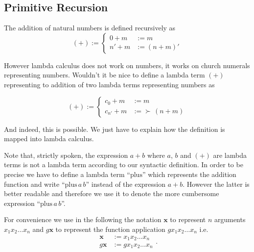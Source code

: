 \subsection{Primitive Recursion}

The addition of natural numbers is defined recursively as
$$
(+) :=
\begin{cases}
  0 + m &:= m \\
  n' + m &:= (n + m)'
\end{cases}
$$


However lambda calculus does not work on numbers, it works on church numerals
representing numbers. Wouldn't it be nice to define a lambda term $(+)$
representing to addition of two lambda terms representing numbers as

$$
(+) :=
\begin{cases}
  c_0 + m &:= m \\
  c_{n'} + m &:= \succ\, (n + m)
\end{cases}
$$

And indeed, this is possible. We just have to explain how the definition is
mapped into lambda calculus.

Note that, strictly spoken, the expression $a + b$ where $a$, $b$ and $(+)$
are lambda terms is not a lambda term according to our syntactic
definition. In order to be precise we have to define a lambda term
``$\text{plus}$'' which represents the addition function and write
``$\text{plus}\, a \, b$'' instead of the expression $a + b$. However the
latter is better readable and therefore we use it to denote the more
cumbersome expression ``$\text{plus}\, a \, b$''.

For convenience we use in the following the notation $\mathbf{x}$ to represent
$n$ arguments $x_1 x_2\ldots x_n$ and $g \mathbf{x}$ to represent the function
application $g x_1 x_2 \ldots x_n$ i.e.
$$
\begin{array}{lll}
  \mathbf{x} & := x_1 x_2 \ldots x_n\\
  g \mathbf{x} & := g x_1 x_2 \ldots x_n
\end{array}
.
$$

